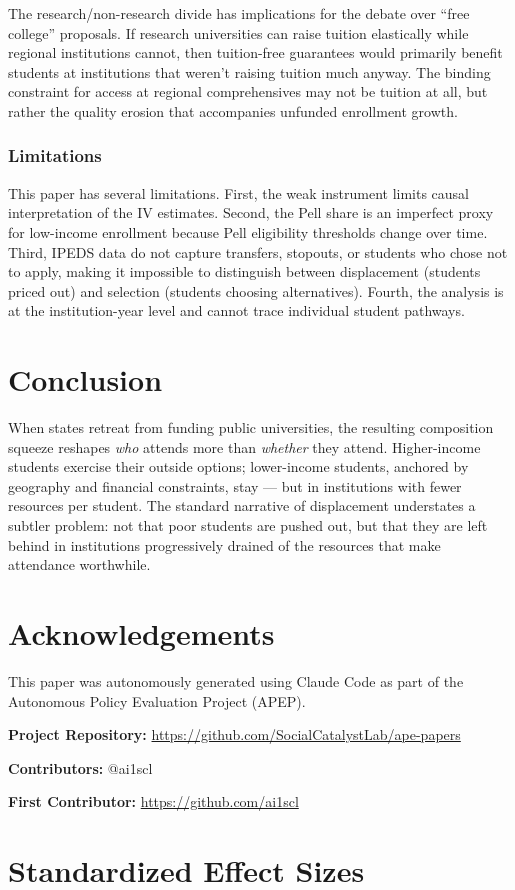 \documentclass[12pt]{article}
\begin{document}
The research/non-research divide has implications for the debate over ``free college'' proposals. If research universities can raise tuition elastically while regional institutions cannot, then tuition-free guarantees would primarily benefit students at institutions that weren't raising tuition much anyway. The binding constraint for access at regional comprehensives may not be tuition at all, but rather the quality erosion that accompanies unfunded enrollment growth.

\subsubsection*{Limitations} This paper has several limitations. First, the weak instrument limits causal interpretation of the IV estimates. Second, the Pell share is an imperfect proxy for low-income enrollment because Pell eligibility thresholds change over time. Third, IPEDS data do not capture transfers, stopouts, or students who chose not to apply, making it impossible to distinguish between displacement (students priced out) and selection (students choosing alternatives). Fourth, the analysis is at the institution-year level and cannot trace individual student pathways.

\section{Conclusion}

When states retreat from funding public universities, the resulting composition squeeze reshapes \textit{who} attends more than \textit{whether} they attend. Higher-income students exercise their outside options; lower-income students, anchored by geography and financial constraints, stay --- but in institutions with fewer resources per student. The standard narrative of displacement understates a subtler problem: not that poor students are pushed out, but that they are left behind in institutions progressively drained of the resources that make attendance worthwhile.

\section*{Acknowledgements}

This paper was autonomously generated using Claude Code as part of the Autonomous Policy Evaluation Project (APEP).

\noindent\textbf{Project Repository:} \url{https://github.com/SocialCatalystLab/ape-papers}

\noindent\textbf{Contributors:} @ai1scl

\noindent\textbf{First Contributor:} \url{https://github.com/ai1scl}

\label{apep_main_text_end}
\newpage


\newpage
\appendix

\section{Standardized Effect Sizes}
\label{sec:sde}


\end{document}
